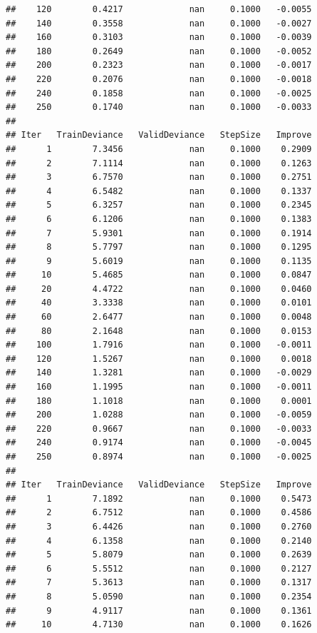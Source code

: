 \documentclass[]{book}
\begin{document}
\begin{verbatim}
##    120        0.4217             nan     0.1000   -0.0055
##    140        0.3558             nan     0.1000   -0.0027
##    160        0.3103             nan     0.1000   -0.0039
##    180        0.2649             nan     0.1000   -0.0052
##    200        0.2323             nan     0.1000   -0.0017
##    220        0.2076             nan     0.1000   -0.0018
##    240        0.1858             nan     0.1000   -0.0025
##    250        0.1740             nan     0.1000   -0.0033
## 
## Iter   TrainDeviance   ValidDeviance   StepSize   Improve
##      1        7.3456             nan     0.1000    0.2909
##      2        7.1114             nan     0.1000    0.1263
##      3        6.7570             nan     0.1000    0.2751
##      4        6.5482             nan     0.1000    0.1337
##      5        6.3257             nan     0.1000    0.2345
##      6        6.1206             nan     0.1000    0.1383
##      7        5.9301             nan     0.1000    0.1914
##      8        5.7797             nan     0.1000    0.1295
##      9        5.6019             nan     0.1000    0.1135
##     10        5.4685             nan     0.1000    0.0847
##     20        4.4722             nan     0.1000    0.0460
##     40        3.3338             nan     0.1000    0.0101
##     60        2.6477             nan     0.1000    0.0048
##     80        2.1648             nan     0.1000    0.0153
##    100        1.7916             nan     0.1000   -0.0011
##    120        1.5267             nan     0.1000    0.0018
##    140        1.3281             nan     0.1000   -0.0029
##    160        1.1995             nan     0.1000   -0.0011
##    180        1.1018             nan     0.1000    0.0001
##    200        1.0288             nan     0.1000   -0.0059
##    220        0.9667             nan     0.1000   -0.0033
##    240        0.9174             nan     0.1000   -0.0045
##    250        0.8974             nan     0.1000   -0.0025
## 
## Iter   TrainDeviance   ValidDeviance   StepSize   Improve
##      1        7.1892             nan     0.1000    0.5473
##      2        6.7512             nan     0.1000    0.4586
##      3        6.4426             nan     0.1000    0.2760
##      4        6.1358             nan     0.1000    0.2140
##      5        5.8079             nan     0.1000    0.2639
##      6        5.5512             nan     0.1000    0.2127
##      7        5.3613             nan     0.1000    0.1317
##      8        5.0590             nan     0.1000    0.2354
##      9        4.9117             nan     0.1000    0.1361
##     10        4.7130             nan     0.1000    0.1626

\end{verbatim}
\end{document}
